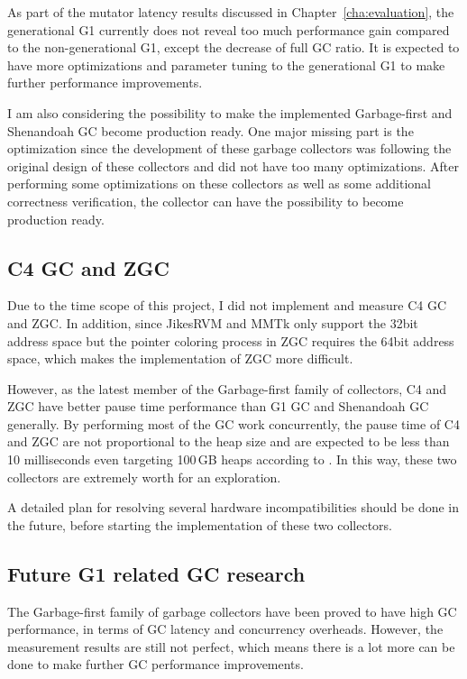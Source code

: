 As part of the mutator latency results discussed in Chapter~\ref{cha:evaluation},
the generational G1 currently does not reveal too much performance gain compared to
the non-generational G1, except the decrease of full GC ratio. It is expected to have more optimizations and parameter
tuning to the generational G1 to make further performance improvements.

I am also considering the possibility to make the implemented Garbage-first
and Shenandoah GC become production ready. One major missing part is the optimization
since the development of these garbage collectors was following the original design
of these collectors and did not have too many optimizations. After performing some
optimizations on these collectors as well as some additional correctness verification,
the collector can have the possibility to become production ready.

\subsection{C4 GC and ZGC}

Due to the time scope of this project, I did not implement and measure C4 GC and ZGC.
In addition, since JikesRVM and MMTk only support the 32bit address space but the pointer
coloring process in ZGC requires the 64bit address space, which makes the implementation
of ZGC more difficult.

However, as the latest member of the Garbage-first family of collectors, C4 and ZGC
have better pause time performance than G1 GC and Shenandoah GC generally.
By performing most of the GC work concurrently, the pause time of C4 and ZGC are not proportional to the heap size and
are expected to be less than 10 milliseconds even targeting 100\,GB heaps according to \cite{liden_karlsson_2018}.
In this way, these two collectors are extremely worth for an exploration.

A detailed plan for resolving several hardware incompatibilities should be done in the future,
before starting the implementation of these two collectors.

\subsection{Future G1 related GC research}

The Garbage-first family of garbage collectors have been proved to have high GC performance,
in terms of GC latency and concurrency overheads. However, the measurement results are still
not perfect, which means there is a lot more can be done to make further GC performance improvements.

